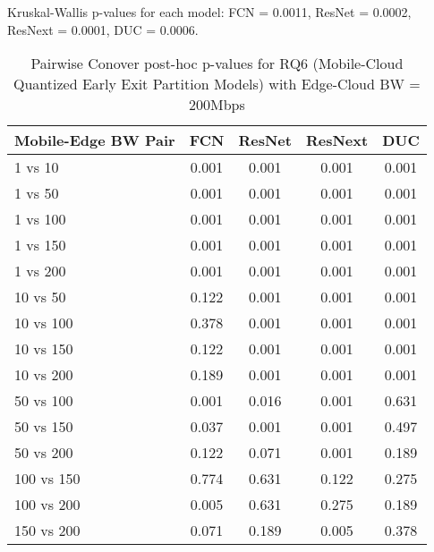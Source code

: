 \begin{table}[h]
\centering
\caption{Pairwise Conover post-hoc p-values for RQ6 (Mobile-Cloud Quantized Early Exit Partition Models) with Edge-Cloud BW = 200Mbps}
\label{tab:conover_mobile_cloud_quantized_earlyexit_partition_ec200}
\smallskip
Kruskal-Wallis p-values for each model: FCN = 0.0011, ResNet = 0.0002, ResNext = 0.0001, DUC = 0.0006.

\begin{tabular}{lcccc}
\toprule
Mobile-Edge BW Pair & FCN & ResNet & ResNext & DUC \\
\midrule
1 vs 10 & 0.001 & 0.001 & 0.001 & 0.001 \\
1 vs 50 & 0.001 & 0.001 & 0.001 & 0.001 \\
1 vs 100 & 0.001 & 0.001 & 0.001 & 0.001 \\
1 vs 150 & 0.001 & 0.001 & 0.001 & 0.001 \\
1 vs 200 & 0.001 & 0.001 & 0.001 & 0.001 \\
10 vs 50 & 0.122 & 0.001 & 0.001 & 0.001 \\
10 vs 100 & 0.378 & 0.001 & 0.001 & 0.001 \\
10 vs 150 & 0.122 & 0.001 & 0.001 & 0.001 \\
10 vs 200 & 0.189 & 0.001 & 0.001 & 0.001 \\
50 vs 100 & 0.001 & 0.016 & 0.001 & 0.631 \\
50 vs 150 & 0.037 & 0.001 & 0.001 & 0.497 \\
50 vs 200 & 0.122 & 0.071 & 0.001 & 0.189 \\
100 vs 150 & 0.774 & 0.631 & 0.122 & 0.275 \\
100 vs 200 & 0.005 & 0.631 & 0.275 & 0.189 \\
150 vs 200 & 0.071 & 0.189 & 0.005 & 0.378 \\
\bottomrule
\end{tabular}
\end{table}

